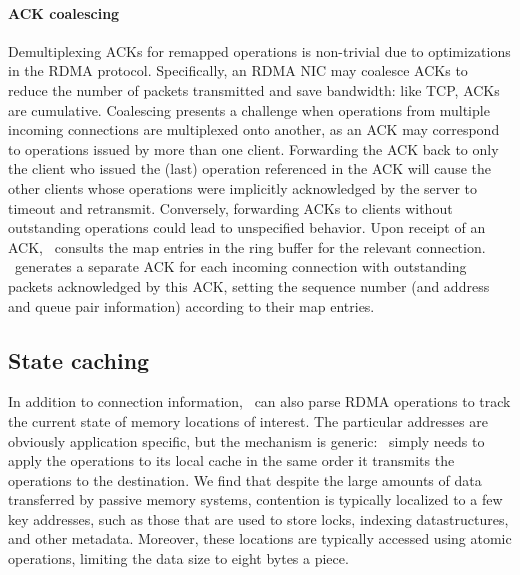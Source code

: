 \paragraph{ACK coalescing}
Demultiplexing ACKs for remapped operations is non-trivial due to
optimizations in the RDMA protocol. Specifically, an RDMA NIC may
coalesce ACKs to reduce the number of packets transmitted and save
bandwidth: like TCP, ACKs are cumulative. Coalescing presents a
challenge when operations from multiple incoming connections are
multiplexed onto another, as an ACK may correspond to operations
issued by more than one client.  Forwarding the ACK back to only the
client who issued the (last) operation referenced in the ACK will
cause the other clients whose operations were implicitly acknowledged
by the server to timeout and retransmit.  Conversely, forwarding ACKs
to clients without outstanding operations could lead to unspecified
behavior.
%
Upon receipt of an ACK, \sword\ consults the map entries in the ring
buffer for the relevant connection.  \sword\ generates a separate ACK
for each incoming connection with outstanding packets acknowledged by
this ACK, setting the sequence number (and address and queue pair
information) according to their map entries.


\subsection{State caching}

In addition to connection information, \sword\ can also parse RDMA
operations to track the current state of memory locations of interest.
The particular addresses are obviously application specific, but the
mechanism is generic: \sword\ simply needs to apply the operations to
its local cache in the same order it transmits the operations to the
destination.  We find that despite the large amounts of data
transferred by passive memory systems, contention is typically
localized to a few key addresses, such as those that are used to store
locks, indexing datastructures, and other metadata.  Moreover, these
locations are typically accessed using atomic operations, limiting
the data size to eight bytes a piece.

